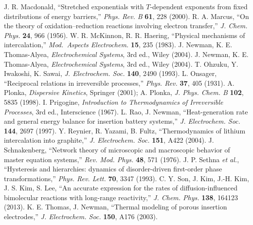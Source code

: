  J. R. Macdonald, ``Stretched exponentials with $T$-dependent exponents from fixed distributions of energy barriers,'' \emph{Phys. Rev. B} \textbf{61}, 228 (2000).
 R. A. Marcus, ``On the theory of oxidation--reduction reactions involving electron transfer,'' \emph{J. Chem. Phys.} \textbf{24}, 966 (1956).
 W. R. McKinnon, R. R. Haering, ``Physical mechanisms of intercalation,'' \emph{Mod.\ Aspects Electrochem.} \textbf{15}, 235 (1983).
 J. Newman, K. E. Thomas-Alyea, \emph{Electrochemical Systems}, 3rd ed., Wiley (2004).
 J. Newman, K. E. Thomas-Alyea, \emph{Electrochemical Systems}, 3rd ed., Wiley (2004).
 T. Ohzuku, Y. Iwakoshi, K. Sawai, \emph{J. Electrochem. Soc.} \textbf{140}, 2490 (1993).
 L. Onsager, ``Reciprocal relations in irreversible processes,'' \emph{Phys. Rev.} \textbf{37}, 405 (1931).
 A. Plonka, \emph{Dispersive Kinetics}, Springer (2001); A. Plonka, \emph{J. Phys. Chem. B} \textbf{102}, 5835 (1998).
 I. Prigogine, \emph{Introduction to Thermodynamics of Irreversible Processes}, 3rd ed., Interscience (1967).
 L. Rao, J. Newman, ``Heat-generation rate and general energy balance for insertion battery systems,'' \emph{J. Electrochem. Soc.} \textbf{144}, 2697 (1997).
 Y. Reynier, R. Yazami, B. Fultz, ``Thermodynamics of lithium intercalation into graphite,'' \emph{J. Electrochem. Soc.} \textbf{151}, A422 (2004).
 J. Schnakenberg, ``Network theory of microscopic and macroscopic behavior of master equation systems,'' \emph{Rev. Mod. Phys.} \textbf{48}, 571 (1976).
 J. P. Sethna \emph{et al.}, ``Hysteresis and hierarchies: dynamics of disorder-driven first-order phase transformations,'' \emph{Phys. Rev. Lett.} \textbf{70}, 3347 (1993).
 C. Y. Son, J. Kim, J.-H. Kim, J. S. Kim, S. Lee, ``An accurate expression for the rates of diffusion-influenced bimolecular reactions with long-range reactivity,'' \emph{J. Chem. Phys.} \textbf{138}, 164123 (2013).
 K. E. Thomas, J. Newman, ``Thermal modeling of porous insertion electrodes,'' \emph{J. Electrochem. Soc.} \textbf{150}, A176 (2003).
